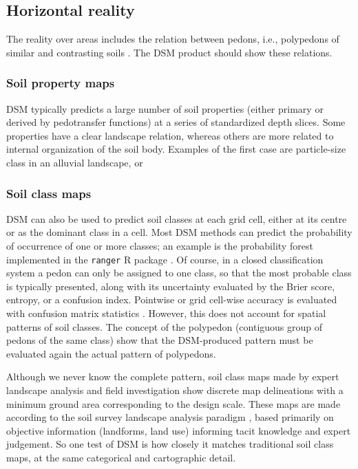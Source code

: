 \documentclass[soil, manuscript]{copernicus}
\begin{document}
\subsection{Horizontal reality}
%

\par
The reality over areas includes the relation between pedons, i.e., polypedons of similar and contrasting soils \citep{johnsonPedonPolypedon1963}.
%
The DSM product should show these relations.
%

\subsubsection{Soil property  maps}

DSM typically predicts a  large number of soil properties (either primary or derived by pedotransfer functions) at a series of standardized depth slices.
%
Some properties have a clear landscape relation, whereas others are more related to internal organization of the soil body.
%
Examples of the first case are particle-size class in an alluvial landscape, or 

\subsubsection{Soil class maps}

\par
DSM can also be used to predict soil classes at each grid cell, either at its centre or as the dominant class in a cell.
%
Most DSM methods can predict the probability of occurrence of one or more classes; an example is the probability forest implemented in the \texttt{ranger} R package \citep{Wright.Ziegler2017}.
%
Of course, in a closed classification system a pedon can only be assigned to one class, so that the most probable class is typically presented, along with its uncertainty evaluated by the Brier score, entropy, or a confusion index.
%
Pointwise or grid cell-wise  accuracy is evaluated with confusion matrix statistics \citep{CongaltonAssessingaccuracyremotely2009}.
%
However, this does not account for spatial patterns of soil classes.
%
The concept of the polypedon (contiguous group of pedons of the same class) show that the DSM-produced pattern must be evaluated again the actual pattern of polypedons.

\par
Although we never know the complete pattern, soil class maps made by expert landscape analysis and field investigation show discrete map delineations with a minimum ground area corresponding to the design scale.
%
These maps are made according to the soil survey landscape analysis paradigm \citep{hudsonSoilSurveyParadigmbased1992}, based primarily on objective information (landforms, land use) informing tacit knowledge and expert judgement.
%
So one test of DSM is how closely it matches traditional soil class maps, at the same categorical and cartographic detail.
\end{document}

